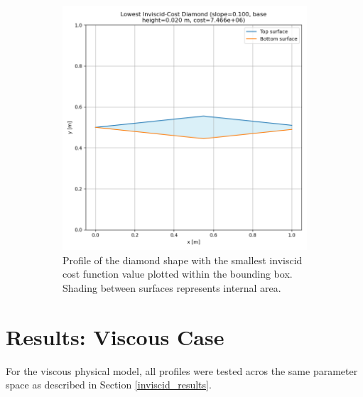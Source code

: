\documentclass[11pt]{article}
\begin{document}
\begin{figure}[H]
\begin{subfigure}[b]{0.44\textwidth}
    \includegraphics[width=\linewidth]{../results/inviscid/lowest_cost_diamond.png}
    \caption{Profile of the diamond shape with the smallest inviscid cost function value plotted within the bounding box. Shading between surfaces represents internal area.}
    \label{fig:inv-diamond-b}
\end{subfigure}
\caption{}
\label{fig:inv-diamond}
\end{figure}


\section{Results: Viscous Case} \label{viscous_results}
For the viscous physical model, all profiles were tested acros the same parameter space as described in Section \ref{inviscid_results}.
\end{document}
